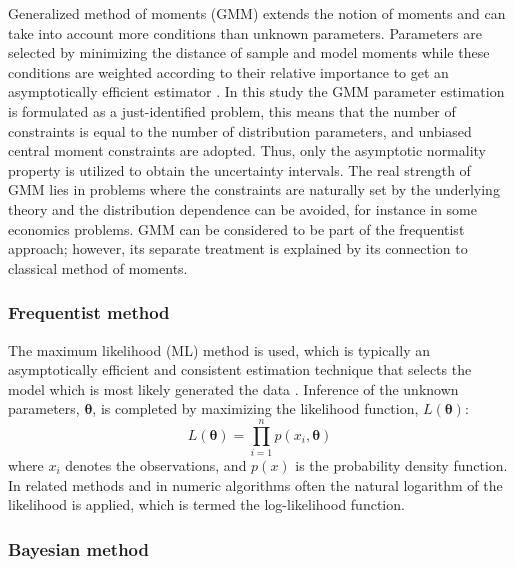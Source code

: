 Generalized method of moments (GMM) extends the notion of moments and can take into account more conditions than unknown parameters. Parameters are selected by minimizing the distance of sample and model moments while these conditions are weighted according to their relative importance to get an asymptotically efficient estimator \citep{Hall2005}. In this study the GMM parameter estimation is formulated as a just-identified problem, this means that the number of constraints is equal to the number of distribution parameters, and unbiased central moment constraints are adopted. Thus, only the asymptotic normality property is utilized to obtain the uncertainty intervals. The real strength of GMM lies in problems where the constraints are naturally set by the underlying theory and the distribution dependence can be avoided, for instance in some economics problems. GMM can be considered to be part of the frequentist approach; however, its separate treatment is explained by its connection to classical method of moments.

\subsubsection*{Frequentist method}

The maximum likelihood (ML) method is used, which is typically an asymptotically efficient and consistent estimation technique that selects the model which is most likely generated the data \citep{Casella2001}. Inference of the unknown parameters, $\boldsymbol{\theta}$, is completed by maximizing the likelihood function, $L\left(\boldsymbol{\theta } \right)$:
\begin{equation}
\label{eq:max_like}
	L\left(\boldsymbol{\theta } \right) = \prod\limits_{i = 1}^n {p\left( {{x_i},{\boldsymbol{\theta }}} \right)}
\end{equation}
where $x_i$ denotes the observations, and $p(x)$ is the probability density function. In related methods and in numeric algorithms often the natural logarithm of the likelihood is applied, which is termed the log-likelihood function.

\subsubsection*{Bayesian method}

